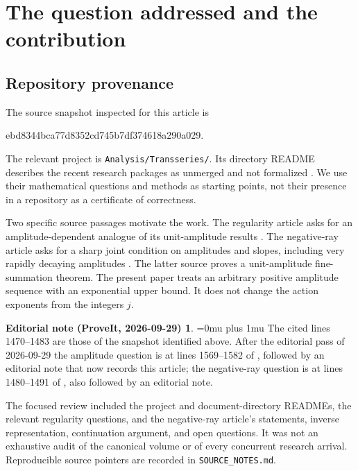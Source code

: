 \documentclass[11pt,a4paper]{article}
\numberwithin{equation}{section}
\theoremstyle{definition}
\theoremstyle{remark}
\theoremstyle{definition}
\newtheorem*{ednoteinner}{Editorial note (ProveIt, 2026-09-29)}
\newenvironment{ednote}{\begin{ednoteinner}\sloppy\Urlmuskip=0mu plus 1mu\relax}{\end{ednoteinner}}
\begin{document}
\clearpage
\setcounter{tocdepth}{2}
\tableofcontents
\clearpage

\section{The question addressed and the contribution}
\label{sec:context}

\subsection{Repository provenance}
The source snapshot inspected for this article is
\begin{center}\small\ttfamily
ebd8344bca77d8352cd745b7df374618a290a029.
\end{center}
The relevant project is \texttt{Analysis/Transseries/}. Its directory
README describes the recent research packages as unmerged and not
formalized \cite{project}. We use their mathematical questions and
methods as starting points, not their presence in a repository as a
certificate of correctness.

Two specific source passages motivate the work. The regularity article
asks for an amplitude-dependent analogue of its unit-amplitude results
\cite[lines 1470--1483]{regularity}. The negative-ray article asks for a
sharp joint condition on amplitudes and slopes, including very rapidly
decaying amplitudes \cite[section ``Weighted actions and joint
amplitude--slope thresholds'']{negative}. The latter source proves a
unit-amplitude fine-summation theorem. The present paper treats an
arbitrary positive amplitude sequence with an exponential upper bound.
It does not change the action exponents from the integers $j$.
\begin{ednote}
The cited lines 1470--1483 are those of the snapshot identified above. After
the editorial pass of 2026-09-29 the amplitude question is at lines
1569--1582 of
, followed
by an editorial note that now records this article; the negative-ray
question is at lines 1480--1491 of
, also
followed by an editorial note.
\end{ednote}

The focused review included the project and document-directory READMEs,
the relevant regularity questions, and the negative-ray article's
statements, inverse representation, continuation argument, and open
questions. It was not an exhaustive audit of the canonical volume or of
every concurrent research arrival. Reproducible source pointers are
recorded in \texttt{SOURCE\_NOTES.md}.
\end{document}
